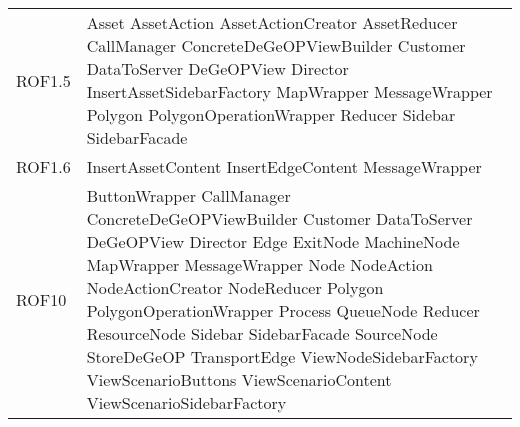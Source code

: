 \begin{longtable}{p{2.5cm}!{\VRule[1pt]}p{5cm}}
		ROF1.5 & Asset \newline AssetAction \newline AssetActionCreator \newline AssetReducer \newline CallManager \newline ConcreteDeGeOPViewBuilder \newline Customer \newline DataToServer \newline DeGeOPView \newline Director \newline InsertAssetSidebarFactory \newline MapWrapper \newline MessageWrapper \newline Polygon \newline PolygonOperationWrapper \newline Reducer \newline Sidebar \newline SidebarFacade\\
		ROF1.6 & InsertAssetContent \newline InsertEdgeContent \newline MessageWrapper\\
		ROF10 & ButtonWrapper \newline CallManager \newline ConcreteDeGeOPViewBuilder \newline Customer \newline DataToServer \newline DeGeOPView \newline Director \newline Edge \newline ExitNode \newline MachineNode \newline MapWrapper \newline MessageWrapper \newline Node \newline NodeAction \newline NodeActionCreator \newline NodeReducer \newline Polygon \newline PolygonOperationWrapper \newline Process \newline QueueNode \newline Reducer \newline ResourceNode \newline Sidebar \newline SidebarFacade \newline SourceNode \newline StoreDeGeOP \newline TransportEdge \newline ViewNodeSidebarFactory \newline ViewScenarioButtons \newline ViewScenarioContent \newline ViewScenarioSidebarFactory\\

\end{longtable}
